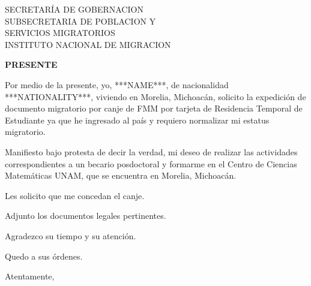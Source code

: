 \documentclass[10pt]{letter}
\date{México ***DAY*** de ***MONTH*** del ***YEAR***}
\begin{document}
\begin{letter}{SECRETARÍA DE GOBERNACION\\SUBSECRETARIA DE POBLACION Y\\SERVICIOS MIGRATORIOS\\INSTITUTO NACIONAL DE MIGRACION}

\opening{\textbf{PRESENTE}}

Por medio de la presente, yo, ***NAME***, de nacionalidad ***NATIONALITY***, viviendo en Morelia, Michoacán, solicito la expedición de documento migratorio por canje de FMM por tarjeta de Residencia Temporal de Estudiante ya que he ingresado al país y requiero normalizar mi estatus migratorio.

Manifiesto bajo protesta de decir la verdad,  mi deseo de realizar las actividades correspondientes a un becario posdoctoral y formarme en el Centro de Ciencias Matemáticas UNAM, que se encuentra en Morelia, Michoacán.

Les solicito que me concedan el canje.

Adjunto los documentos legales pertinentes.

Agradezco su tiempo y su atención.

Quedo a sus órdenes.

\vspace{2\parskip}
\closing{Atentamente,}
\vspace{2\parskip}

\end{letter}
 
\end{document}
